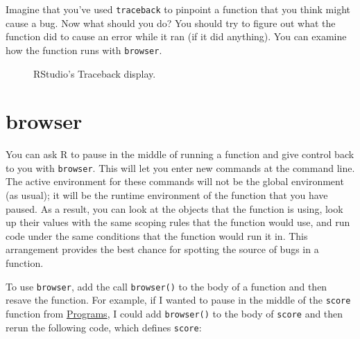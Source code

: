 \documentclass[
  letterpaper,
  DIV=11,
  numbers=noendperiod]{scrbook}
\makeatletter
\newcommand*\pandocbounded[1]{%
  \sbox\pandoc@box{#1}%
  \Gscale@div\@tempa{\textheight}{\dimexpr\ht\pandoc@box+\dp\pandoc@box\relax}%
  \Gscale@div\@tempb{\linewidth}{\wd\pandoc@box}%
  \ifdim\@tempb\p@<\@tempa\p@\let\@tempa\@tempb\fi%
  \ifdim\@tempa\p@<\p@\scalebox{\@tempa}{\usebox\pandoc@box}%
  \else\usebox{\pandoc@box}%
  \fi%
}
\makeatother
\begin{document}
Imagine that you've used \texttt{traceback} to pinpoint a function that
you think might cause a bug. Now what should you do? You should try to
figure out what the function did to cause an error while it ran (if it
did anything). You can examine how the function runs with
\texttt{browser}.

\begin{figure}

\centering{

\pandocbounded{\texttt{[image: images/hopr\_ae02.png]}}

}

\caption{\label{fig-hide-traceback}RStudio's Traceback display.}

\end{figure}%

\section{browser}\label{browser}

You can ask R to pause in the middle of running a function and give
control back to you with \texttt{browser}. This will let you enter new
commands at the command line. The active environment for these commands
will not be the global environment (as usual); it will be the runtime
environment of the function that you have paused. As a result, you can
look at the objects that the function is using, look up their values
with the same scoping rules that the function would use, and run code
under the same conditions that the function would run it in. This
arrangement provides the best chance for spotting the source of bugs in
a function.

To use \texttt{browser}, add the call \texttt{browser()} to the body of
a function and then resave the function. For example, if I wanted to
pause in the middle of the \texttt{score} function from
\hyperref[sec-programs]{Programs}, I could add \texttt{browser()} to the
body of \texttt{score} and then rerun the following code, which defines
\texttt{score}:
\end{document}
